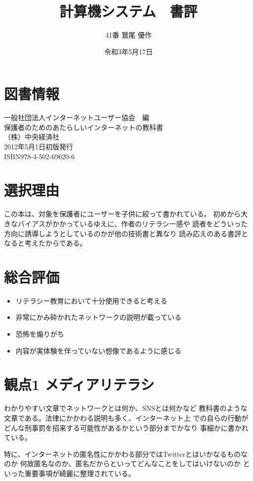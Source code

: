 \documentclass[titlepage]{jarticle}
\title{計算機システム　書評}
\author{41番 鷲尾 優作}
\date{令和3年5月17日}
\begin{document}
\maketitle

\section{図書情報}
一般社団法人インターネットユーザー協会　編\\
保護者のためのあたらしいインターネットの教科書\\

（株）中央経済社\\
2012年5月1日初版発行\\
ISBN978-4-502-69620-6

\section{選択理由}
この本は、対象を保護者にユーザーを子供に絞って書かれている。
初めから大きなバイアスがかかっているゆえに、作者のリテラシー感や
読者をどういった方向に誘導しようとしているのかが他の技術書と異なり
読み応えのある書評となると考えたからである。

\section{総合評価}
\begin{itemize}
    \item リテラシー教育において十分使用できると考える
    \item 非常にかみ砕かれたネットワークの説明が載っている
    \item 恐怖を煽りがち
    \item 内容が実体験を伴っていない想像であるように感じる
\end{itemize}

\section{観点1 メディアリテラシ}
わかりやすい文章でネットワークとは何か、SNSとは何かなど
教科書のような文章である。法律にかかわる説明も多く、インターネット上
での自らの行動がどんな刑事罰を招来する可能性があるかという部分までかなり
事細かに書かれている。

特に、インターネットの匿名性にかかわる部分ではTwitterとはいかなるものなのか
何故匿名なのか、匿名だからといってどんなことをしてはいけないのか
といった重要事項が綺麗に整理されている。
\end{document}
